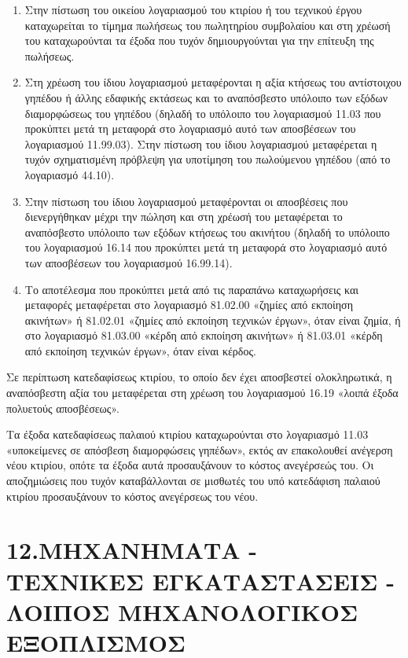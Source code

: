 \documentclass[A4,10pt,greek]{book}
\begin{document}
\begin{enumerate}

\item Στην πίστωση του οικείου λογαριασμού του κτιρίου ή του τεχνικού έργου καταχωρείται το τίμημα πωλήσεως του πωλητηρίου συμβολαίου και στη χρέωσή του καταχωρούνται τα έξοδα που τυχόν δημιουργούνται για την επίτευξη της πωλήσεως.

\item Στη χρέωση του ίδιου λογαριασμού μεταφέρονται η αξία κτήσεως του αντίστοιχου γηπέδου ή άλλης εδαφικής εκτάσεως και το αναπόσβεστο υπόλοιπο των εξόδων διαμορφώσεως του γηπέδου (δηλαδή το υπόλοιπο του λογαριασμού 11.03 που προκύπτει μετά τη μεταφορά στο λογαριασμό αυτό των αποσβέσεων του λογαριασμού 11.99.03). Στην πίστωση του ίδιου λογαριασμού μεταφέρεται η τυχόν σχηματισμένη πρόβλεψη για υποτίμηση του πωλούμενου γηπέδου (από το λογαριασμό 44.10).

\item Στην πίστωση του ίδιου λογαριασμού μεταφέρονται οι αποσβέσεις που διενεργήθηκαν μέχρι την πώληση και στη χρέωσή του μεταφέρεται το αναπόσβεστο υπόλοιπο των εξόδων κτήσεως του ακινήτου (δηλαδή το υπόλοιπο του λογαριασμού 16.14 που προκύπτει μετά τη μεταφορά στο λογαριασμό αυτό των αποσβέσεων του λογαριασμού 16.99.14).

\item Το αποτέλεσμα που προκύπτει μετά από τις παραπάνω καταχωρήσεις και μεταφορές μεταφέρεται στο λογαριασμό 81.02.00 «ζημίες από εκποίηση ακινήτων» ή 81.02.01 «ζημίες από εκποίηση τεχνικών έργων», όταν είναι ζημία, ή στο λογαριασμό 81.03.00 «κέρδη από εκποίηση ακινήτων» ή 81.03.01 «κέρδη από εκποίηση τεχνικών έργων», όταν είναι κέρδος.

\end{enumerate}

Σε περίπτωση κατεδαφίσεως κτιρίου, το οποίο δεν έχει αποσβεστεί ολοκληρωτικά, η αναπόσβεστη αξία του μεταφέρεται στη χρέωση του λογαριασμού 16.19 «λοιπά έξοδα πολυετούς αποσβέσεως».

Τα έξοδα κατεδαφίσεως παλαιού κτιρίου καταχωρούνται στο λογαριασμό 11.03 «υποκείμενες σε απόσβεση διαμορφώσεις γηπέδων», εκτός αν επακολουθεί ανέγερση νέου κτιρίου, οπότε τα έξοδα αυτά προσαυξάνουν το κόστος ανεγέρσεώς του. Οι αποζημιώσεις που τυχόν καταβάλλονται σε μισθωτές του υπό κατεδάφιση παλαιού κτιρίου προσαυξάνουν το κόστος ανεγέρσεως του νέου.

\section{12.ΜΗΧΑΝΗΜΑΤΑ - ΤΕΧΝΙΚΕΣ ΕΓΚΑΤΑΣΤΑΣΕΙΣ - ΛΟΙΠΟΣ ΜΗΧΑΝΟΛΟΓΙΚΟΣ ΕΞΟΠΛΙΣΜΟΣ}
\end{document}
